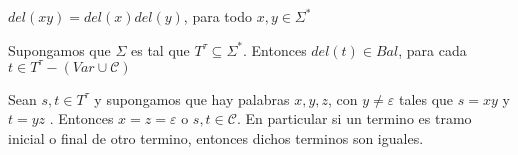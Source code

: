   \begin{lemma}
    \(del(xy)=del(x)del(y)\), para todo \(x,y\in \Sigma ^{\ast }\)
  \end{lemma}

  \begin{lemma}
    Supongamos que \(\Sigma \) es tal que \(T^{\tau }\subseteq \Sigma ^{\ast }\). Entonces \(del(t)\in Bal\), para cada \(t\in T^{\tau }-(Var\cup \mathcal{C})\)
  \end{lemma}

  \begin{lemma}
    Sean \(s,t\in T^{\tau }\) y supongamos que hay palabras \( x,y,z\), con \(y\neq \varepsilon \) tales que \(s=xy\) y \(t=yz\) . Entonces \( x=z=\varepsilon \) o \(s,t\in \mathcal{C}\). En particular si un termino es tramo inicial o final de otro termino, entonces dichos terminos son iguales.
  \end{lemma}
